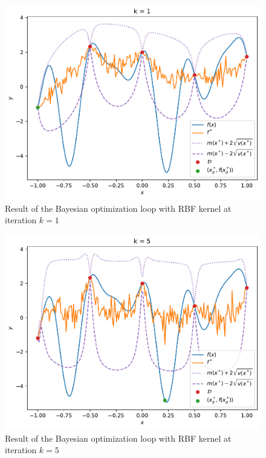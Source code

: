 \begin{figure}%
    \includegraphics[width=\textwidth]{figures/gp/b2-k_1.pdf}
    \caption{Result of the Bayesian optimization loop with RBF kernel at iteration $k = 1$}
\end{figure}
\begin{figure}%
    \includegraphics[width=\textwidth]{figures/gp/b2-k_5.pdf}
    \caption{Result of the Bayesian optimization loop with RBF kernel at iteration $k = 5$}
\end{figure}
